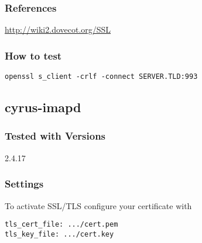 

\subsubsection{References}
\begin{itemize*}
  \item \url{http://wiki2.dovecot.org/SSL}
\end{itemize*}


\subsubsection{How to test}
\begin{lstlisting}
openssl s_client -crlf -connect SERVER.TLD:993
\end{lstlisting}


\subsection{cyrus-imapd}
\subsubsection{Tested with Versions}
\begin{itemize*}
  \item 2.4.17
\end{itemize*}

\subsubsection{Settings}
To activate SSL/TLS configure your certificate with
\begin{lstlisting}
tls_cert_file: .../cert.pem
tls_key_file: .../cert.key
\end{lstlisting}

